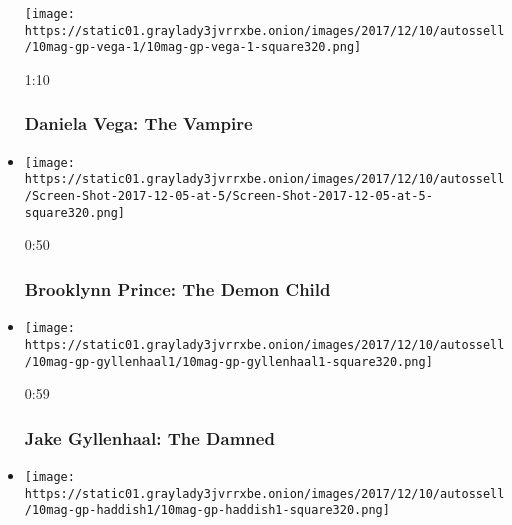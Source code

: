 \begin{itemize}
  \texttt{[image: https://static01.graylady3jvrrxbe.onion/images/2017/12/10/autossell/10mag-gp-vega-1/10mag-gp-vega-1-square320.png]}

  1:10

  \hypertarget{daniela-vega-the-vampire}{%
  \subsubsection{Daniela Vega: The
  Vampire}\label{daniela-vega-the-vampire}}
\item
  \href{https://www.nytimes3xbfgragh.onion/video/magazine/100000005588908/brooklynn-prince-the-demon-child.html?action=click\&module=video-series-bar\&region=header\&pgtype=Article\&playlistId=video/great-performers}{}

  \texttt{[image: https://static01.graylady3jvrrxbe.onion/images/2017/12/10/autossell/Screen-Shot-2017-12-05-at-5/Screen-Shot-2017-12-05-at-5-square320.png]}

  0:50

  \hypertarget{brooklynn-prince-the-demon-child}{%
  \subsubsection{Brooklynn Prince: The Demon
  Child}\label{brooklynn-prince-the-demon-child}}
\item
  \href{https://www.nytimes3xbfgragh.onion/video/magazine/100000005588876/jake-gyllenhaal-the-damned.html?action=click\&module=video-series-bar\&region=header\&pgtype=Article\&playlistId=video/great-performers}{}

  \texttt{[image: https://static01.graylady3jvrrxbe.onion/images/2017/12/10/autossell/10mag-gp-gyllenhaal1/10mag-gp-gyllenhaal1-square320.png]}

  0:59

  \hypertarget{jake-gyllenhaal-the-damned}{%
  \subsubsection{Jake Gyllenhaal: The
  Damned}\label{jake-gyllenhaal-the-damned}}
\item
  \href{https://www.nytimes3xbfgragh.onion/video/magazine/100000005588881/tiffany-haddish-the-macabre-dancer.html?action=click\&module=video-series-bar\&region=header\&pgtype=Article\&playlistId=video/great-performers}{}

  \texttt{[image: https://static01.graylady3jvrrxbe.onion/images/2017/12/10/autossell/10mag-gp-haddish1/10mag-gp-haddish1-square320.png]}


\end{itemize}
